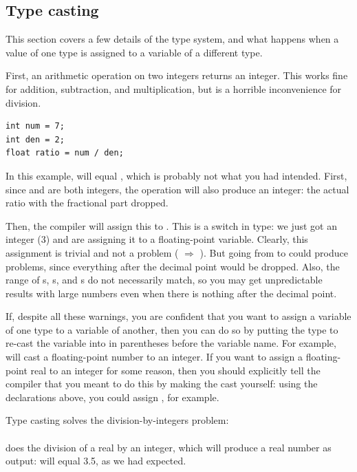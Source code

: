 \subsection{\treesymbol Type casting}\label{casting}   
This section covers a few details of the type system, and what happens
when a value of one type is assigned to a variable of a different type.

First, an arithmetic operation on two integers returns an integer. This works fine for
addition, subtraction, and multiplication, but is a horrible inconvenience for division.\\
\begin{lstlisting}
int num = 7;
int den = 2;
float ratio = num / den;
\end{lstlisting}
In this example,  will equal , which is probably not what you had intended. 
First, since  and  are both integers, the operation
 will also produce an integer: the actual ratio with the
fractional part dropped.

Then, the compiler will assign this to . This is a
switch in type: we just got an integer (3) and are assigning it to
a floating-point variable. Clearly, this assignment is trivial and
not a problem ( $\Rightarrow$ ).  But going from
 to  could produce problems, since everything after the decimal point
would be dropped.  Also, the range of s, s,
and s do not necessarily match, so you may get unpredictable
results with large numbers even when there is nothing after the decimal
point.

If, despite all these warnings, you are confident that you want to
assign a variable of one type to a variable of another, then you can
do so by putting the type to re-cast the variable into in parentheses
before the variable name. For example,  will
cast a floating-point number to an integer.  If you want to assign
a floating-point real to an integer for some reason, then you should
explicitly tell the compiler that you meant to do this by making the cast
yourself: using the declarations above, you could assign , for example.

Type casting solves the division-by-integers problem: \\
\\
does the division of a real by an integer, which will produce a real
number as output:  will equal 3.5, as we had expected.

